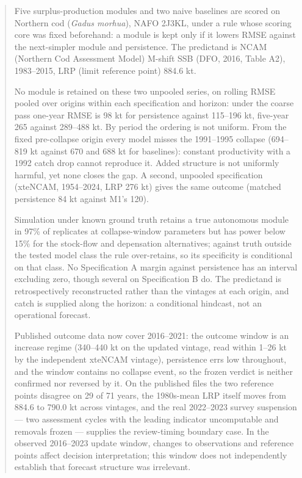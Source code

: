 \documentclass[11pt]{article}
\begin{document}
\begin{abstract}

Five surplus-production modules and two naive baselines are scored on
Northern cod (\emph{Gadus morhua}), NAFO 2J3KL, under a rule whose
scoring core was fixed beforehand: a module is kept only if it lowers
RMSE against the next-simpler module and persistence. The predictand is
NCAM (Northern Cod Assessment Model) M-shift SSB (DFO, 2016, Table A2),
1983--2015, LRP (limit reference point) 884.6 kt.

No module is retained on these two unpooled series, on rolling RMSE
pooled over origins within each specification and horizon: under the
coarse pass one-year RMSE is 98 kt for persistence against 115--196 kt,
five-year 265 against 289--488 kt. By period the ordering is not uniform. From the fixed pre-collapse origin every model misses the 1991--1995
collapse (694--819 kt against 670 and 688 kt for baselines): constant
productivity with a 1992 catch drop cannot reproduce it. Added structure
is not uniformly harmful, yet none closes the gap. A second, unpooled specification (xteNCAM, 1954--2024, LRP 276 kt) gives
the same outcome (matched persistence 84 kt against M1's 120).

Simulation under known ground truth retains a true autonomous module in
97\% of replicates at collapse-window parameters but has power below
15\% for the stock-flow and depensation alternatives; against truth
outside the tested model class the rule over-retains, so its specificity
is conditional on that class. No Specification A margin against
persistence has an interval excluding zero, though several on
Specification B do. The predictand is retrospectively reconstructed rather than the vintages
at each origin, and catch is supplied along the horizon: a conditional
hindcast, not an operational forecast.

Published outcome data now cover 2016--2021: the outcome window is an
increase regime (340--440 kt on the updated vintage, read within 1--26 kt
by the independent xteNCAM vintage), persistence errs low throughout, and
the window contains no collapse event, so the frozen verdict is neither
confirmed nor reversed by it. On the published files the two reference
points disagree on 29 of 71 years, the 1980s-mean LRP itself moves from
884.6 to 790.0 kt across vintages, and the real 2022--2023 survey
suspension --- two assessment cycles with the leading indicator
uncomputable and removals frozen --- supplies the review-timing boundary
case. In the observed 2016--2023 update window, changes to observations
and reference points affect decision interpretation; this window does
not independently establish that forecast structure was irrelevant.

\end{abstract}
\end{document}
